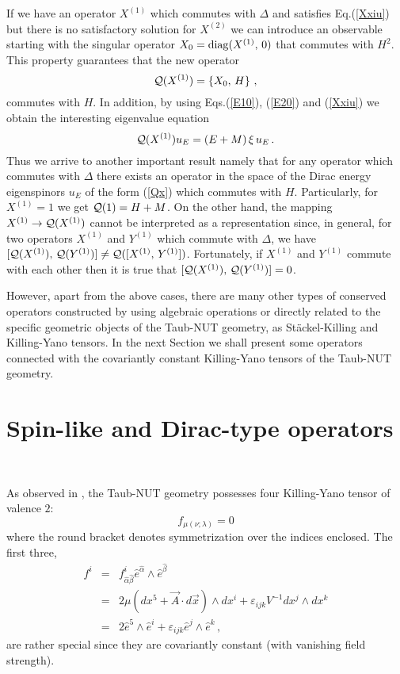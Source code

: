 \documentclass[a4paper,12pt]{article}
\begin{document}
If we have an operator $X^{(1)}$ which commutes with $\Delta$ and 
satisfies Eq.(\ref{Xxiu}) but there is no satisfactory solution for $X^{(2)}$ 
we can introduce  an observable starting with the singular operator 
$X_{0}={\rm diag}(X^{(1)},\,0)$ that commutes with $H^2$. This property 
guarantees that the new operator
\begin{equation}\label{Qx}
{\cal Q}(X^{(1)})=\left\{X_{0},\,H \right\}\,, 
\end{equation}
commutes with $H$. In addition, by using Eqs.(\ref{E10}), (\ref{E20}) and 
(\ref{Xxiu}) we obtain the interesting eigenvalue equation 
\begin{equation}\label{lugu}
{\cal Q}(X^{(1)}) u_{E}= (E+M)\,\xi\,u_{E}\,. 
\end{equation} 
Thus we arrive to another important result namely that for any operator 
which commutes with $\Delta$ there exists an operator in the space of the Dirac 
energy eigenspinors $u_{E}$ of the form (\ref{Qx}) which commutes with 
$H$. Particularly, for $X^{(1)}=1$  we get ${\cal Q}(1)=H+M$.  
On the other hand, the mapping $X^{(1)}\to {\cal Q}(X^{(1)})$ cannot be 
interpreted as a representation since, in general, for two operators 
$X^{(1)}$ and $Y^{(1)}$ which commute with $\Delta$, we have 
$[ {\cal Q}(X^{(1)}),\,  {\cal Q}(Y^{(1)})]\not= 
{\cal Q}([X^{(1)},\,Y^{(1)}])$. 
Fortunately, if $X^{(1)}$ and $Y^{(1)}$ commute with each other then it is true 
that $[ {\cal Q}(X^{(1)}),\,  {\cal Q}(Y^{(1)})]=0$. 

However, apart from the above cases, there are many other types of conserved 
operators constructed by using algebraic operations or directly related to 
the specific geometric objects of the Taub-NUT geometry, as St\" ackel-Killing 
and Killing-Yano tensors. In the next Section we shall present some 
operators connected with the covariantly constant 
Killing-Yano tensors of the Taub-NUT geometry.

\section{Spin-like and Dirac-type operators}
\

As observed in \cite{GR}, the Taub-NUT geometry possesses four 
Killing-Yano tensor of valence $2$:
\begin{equation}\label{(yano)}
f_{\mu(\nu;\lambda)} = 0
\end{equation}
where the round bracket denotes symmetrization over the indices enclosed. 
The first three, 
\begin{eqnarray}\label{KY}
f^i 
&=& f^i_{{\hat \alpha}{\hat \beta}} {\hat e}^{\hat \alpha} \wedge 
{\hat e}^{\hat \beta}\nonumber\\
&=& 2\mu (dx^5 + \vec{A}\cdot d\vec{x})\wedge dx^i +\varepsilon_{ijk} V^{-1} 
dx^j\wedge dx^k\nonumber\\
&=& 2 {\hat e}^5\wedge  {\hat e}^i +\varepsilon_{ijk} {\hat e}^j\wedge 
{\hat e}^k\,,
\end{eqnarray}
are rather special since they are covariantly constant (with 
vanishing field strength). 
\end{document}
